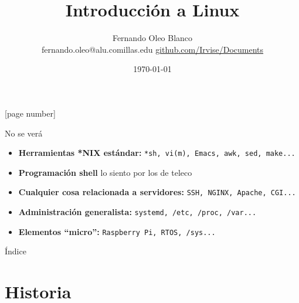 \documentclass[12pt]{beamer}
\begin{document}
	\author{Fernando Oleo Blanco \\ fernando.oleo@alu.comillas.edu \hfill 	\href{https://github.com/Irvise/Documents}{github.com/Irvise/Documents}}
	\title{Introducción a Linux}
	\date{\today}
	[page number]
\begin{frame}[plain]
	\maketitle
\end{frame}

\begin{frame}{No se verá}
	\begin{itemize}
		\item \textbf{Herramientas *NIX estándar:} \texttt{*sh, vi(m), Emacs, awk, sed, make...}
		\item \textbf{Programación shell} \tiny lo siento por los de teleco \normalsize
		\item \textbf{Cualquier cosa relacionada a servidores:} \texttt{SSH, NGINX, Apache, CGI...}
		\item \textbf{Administración generalista:} \texttt{systemd, /etc, /proc, /var...}
		\item \textbf{Elementos ``micro'':} \texttt{Raspberry Pi, RTOS, /sys...}
	\end{itemize}
\end{frame}

\begin{frame}{Índice}
	\tableofcontents
\end{frame}

\section{Historia}
\end{document}
